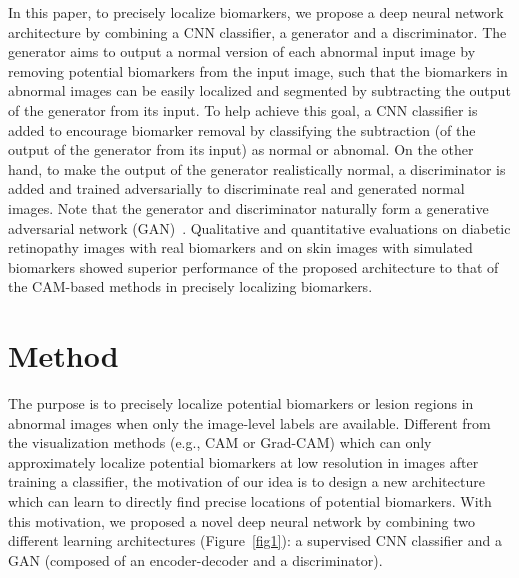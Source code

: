 \documentclass[runningheads]{llncs}
\begin{document}
In this paper, to precisely localize biomarkers, we propose a deep neural network architecture by combining a CNN classifier, a generator and a discriminator. The generator aims to output a normal version of each abnormal input image by removing potential biomarkers from the input image, such that the biomarkers in abnormal images can be easily localized and segmented by subtracting the output of the generator from its input. To help achieve this goal, a CNN classifier is added to encourage biomarker removal by classifying the subtraction (of the output of the generator from its input) as normal or abnomal. On the other hand, to make the output of the generator realistically normal, a discriminator is added and trained adversarially to discriminate real and generated normal images. Note that the generator and discriminator naturally form a generative adversarial network (GAN)~\cite{goodfellow2014generative}. 
Qualitative and quantitative evaluations on diabetic retinopathy images with real biomarkers and on skin images with simulated biomarkers showed superior performance of the proposed architecture to that of the CAM-based methods in precisely localizing biomarkers. 

\section{Method}\label{sec:method}
The purpose is to precisely localize potential biomarkers or lesion regions in abnormal images when only the image-level labels are available. Different from the visualization methods (e.g., CAM or Grad-CAM) which can only approximately localize potential biomarkers at low resolution in images after training a classifier, the motivation of our idea is to design a new architecture which can  learn to directly find precise locations of potential biomarkers. With this motivation, we proposed a novel deep neural network by combining two different learning architectures (Figure~\ref{fig1}): a supervised CNN classifier and a GAN (composed of an encoder-decoder and a discriminator).  
\end{document}
